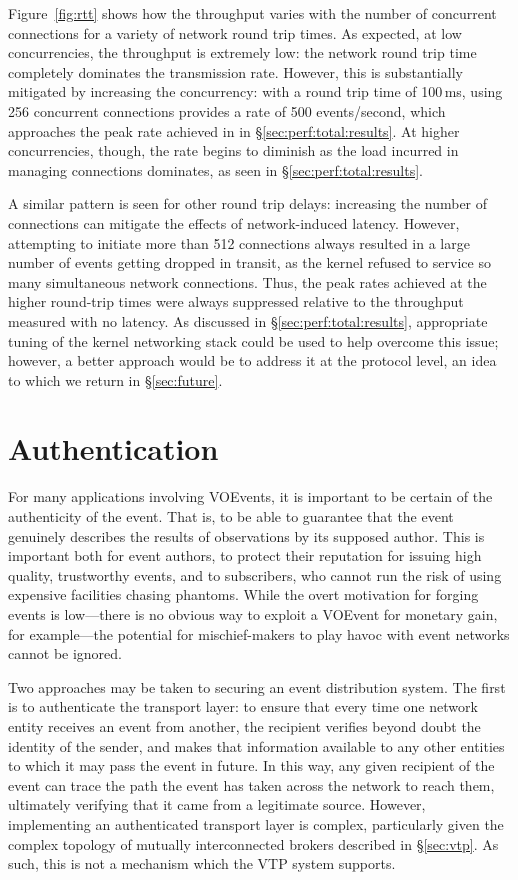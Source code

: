 \documentclass[5p,authoryear]{elsarticle}
\begin{document}
Figure~\ref{fig:rtt} shows how the throughput varies with the number of
concurrent connections for a variety of network round trip times. As expected,
at low concurrencies, the throughput is extremely low: the network round trip
time completely dominates the transmission rate. However, this is
substantially mitigated by increasing the concurrency: with a round trip time
of 100\,ms, using 256 concurrent connections provides a rate of 500
events/second, which approaches the peak rate achieved in in
\S\ref{sec:perf:total:results}. At higher concurrencies, though, the rate
begins to diminish as the load incurred in managing connections dominates,
as seen in \S\ref{sec:perf:total:results}.

A similar pattern is seen for other round trip delays: increasing the number
of connections can mitigate the effects of network-induced latency. However,
attempting to initiate more than 512 connections always resulted in a large
number of events getting dropped in transit, as the kernel refused to service
so many simultaneous network connections. Thus, the peak rates achieved at the
higher round-trip times were always suppressed relative to the throughput
measured with no latency. As discussed in \S\ref{sec:perf:total:results},
appropriate tuning of the kernel networking stack could be used to help
overcome this issue; however, a better approach would be to address it at the
protocol level, an idea to which we return in \S\ref{sec:future}.

\section{Authentication}
\label{sec:security}

For many applications involving VOEvents, it is important to be certain of the
authenticity of the event. That is, to be able to guarantee that the event
genuinely describes the results of observations by its supposed author. This
is important both for event authors, to protect their reputation for issuing
high quality, trustworthy events, and to subscribers, who cannot run the risk
of using expensive facilities chasing phantoms. While the overt motivation for
forging events is low---there is no obvious way to exploit a VOEvent for
monetary gain, for example---the potential for mischief-makers to play havoc
with event networks cannot be ignored.

Two approaches may be taken to securing an event distribution system. The
first is to authenticate the transport layer: to ensure that every time one
network entity receives an event from another, the recipient verifies beyond
doubt the identity of the sender, and makes that information available to any
other entities to which it may pass the event in future. In this way, any
given recipient of the event can trace the path the event has taken across the
network to reach them, ultimately verifying that it came from a legitimate
source.  However, implementing an authenticated transport layer is complex,
particularly given the complex topology of mutually interconnected brokers
described in \S\ref{sec:vtp}. As such, this is not a mechanism which the VTP
system supports.
\end{document}
